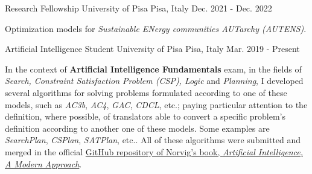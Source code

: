 

\begin{cventries}

  \cventry
    {Research Fellowship} %
    {University of Pisa} %
    {Pisa, Italy} %
    {Dec. 2021 - Dec. 2022} %
    {   
      \begin{cvitems} %
        \item {Optimization models for \textit{Sustainable ENergy communities AUTarchy (AUTENS)}.}
      \end{cvitems}
    }

  \cventry
    {Artificial Intelligence Student} %
    {University of Pisa} %
    {Pisa, Italy} %
    {Mar. 2019 - Present} %
    {   
      \begin{cvitems} %
        \item {In the context of \textbf{Artificial Intelligence Fundamentals} exam, in the fields of \textit{Search, Constraint Satisfaction Problem (CSP), Logic} and \textit{Planning}, I developed several algorithms for solving problems formulated according to one of these models, such as \textit{AC3b}, \textit{AC4}, \textit{GAC}, \textit{CDCL}, etc.; paying particular attention to the definition, where possible, of translators able to convert a specific problem's definition according to another one of these models. Some examples are \textit{SearchPlan}, \textit{CSPlan}, \textit{SATPlan}, etc.. All of these algorithms were submitted and merged in the official \href{https://github.com/aimacode/aima-python}{GitHub repository of Norvig's book, \textit{Artificial Intelligence, A Modern Approach}}.}
      \end{cvitems}
    }


\end{cventries}

